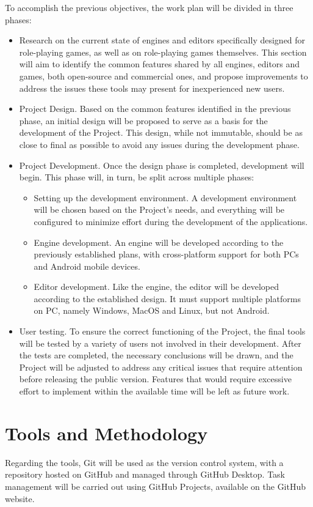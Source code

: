 To accomplish the previous objectives, the work plan will be divided in three phases: 
\begin{itemize}
	\item Research on the current state of engines and editors specifically designed for role-playing games, as well as on role-playing games themselves. This section will aim to identify the common features shared by all engines, editors and games, both open-source and commercial ones, and propose improvements to address the issues these tools may present for inexperienced new users. 
	\item Project Design. Based on the common features identified in the previous phase, an initial design will be proposed to serve as a basis for the development of the Project. This design, while not immutable, should be as close to final as possible to avoid any issues during the development phase.
	\item Project Development. Once the design phase is completed, development will begin. This phase will, in turn, be split across multiple phases:
		\begin{itemize}
			\item Setting up the development environment. A development environment will be chosen based on the Project's needs, and everything will be configured to minimize effort during the development of the applications.
			\item Engine development. An engine will be developed according to the previously established plans, with cross-platform support for both PCs and Android mobile devices.
			\item Editor development. Like the engine, the editor will be developed according to the established design. It must support multiple platforms on PC, namely Windows, MacOS and Linux, but not Android.
		\end{itemize}
	\item User testing. To ensure the correct functioning of the Project, the final tools will be tested by a variety of users not involved in their development. After the tests are completed, the necessary conclusions will be drawn, and the Project will be adjusted to address any critical issues that require attention before releasing the public version. Features that would require excessive effort to implement within the available time will be left as future work.
\end{itemize}


\section*{Tools and Methodology}
Regarding the tools, Git will be used as the version control system, with a repository hosted on GitHub and managed through GitHub Desktop. Task management will be carried out using GitHub Projects, available on the GitHub website.

